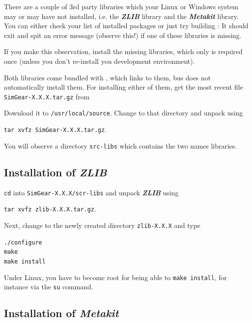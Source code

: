 There are a couple of 3rd party libraries which your Linux or Windows system may or may have not installed, i.e. the \textbf{\textit{ZLIB}} library and the \textbf{\textit{Metakit}} library. You can either check your list of installed packages or just try building \SimGear{}: It should exit and spit an error message (observe this!) if one of these libraries is missing.

If you make this observation, install the missing libraries, which only is required once (unless you don't re-install you development environment). 

Both libraries come bundled with \SimGear{}, which links to them, bus does not automatically install them. For installing either of them, get the most recent file \texttt{SimGear-X.X.X.tar.gz} from
  \medskip

   \medskip

 \noindent
Download it to \texttt{/usr/local/source}. Change to that directory and unpack \SimGear{}
using

        \texttt{tar xvfz SimGear-X.X.X.tar.gz}.

You will observe a directory \texttt{src-libs} which contains the two names libraries. 

\subsection{Installation of \textbf{\textit{ZLIB}\label{zlibinstall}}}

\noindent
 \texttt{cd} into \texttt{SimGear-X.X.X/scr-libs} and unpack \textbf{\textit{ZLIB}} using
 \medskip
 
 \noindent
 				\texttt{tar xvfz zlib-X.X.X.tar.gz}.
 	\medskip

\noindent 				
 Next, change to the newly created directory \texttt{zlib-X.X.X} and type
 \medskip

 \noindent
        \texttt{./configure}\\
        \texttt{make}\\
        \texttt{make install}
 \medskip

 \noindent
 Under Linux, you have to become root for being able to \texttt{make install}, for instance via the \texttt{su} command. 
  
\subsection{Installation of \textbf{\textit{Metakit}\label{metakeitinstall}}}

